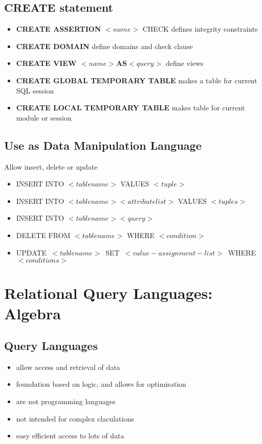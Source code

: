 \documentclass{article}
\begin{document}
	\subsection{CREATE statement}
		\begin{itemize}
			\item \textbf{CREATE ASSERTION} $<name>$ CHECK defines integrity constraints
			\item \textbf{CREATE DOMAIN} define domains and check clause
			\item \textbf{CREATE VIEW $<name> \textbf{AS} <query>$} define views
			\item \textbf{CREATE GLOBAL TEMPORARY TABLE} makes a table for current SQL session
			\item \textbf{CREATE LOCAL TEMPORARY TABLE} makes table for current module or session
		\end{itemize}

	\subsection{Use as Data Manipulation Language}
		Allow insert, delete or update

		\begin{itemize}
			\item INSERT INTO $<tablename>$ VALUES $<tuple>$
			\item INSERT INTO $<tablename> <attributelist>$ VALUES $<tuples>$
			\item INSERT INTO $<tablename> <query>$
			\item DELETE FROM $<tablename>$ WHERE $<condition>$
			\item \mbox{UPDATE $<tablename>$ SET $<value-assignment-list>$ WHERE $<conditions>$}
		\end{itemize}

\section{Relational Query Languages: Algebra}
	\subsection{Query Languages}
		\begin{itemize}
			\item allow access and retrieval of data
			\item foundation based on logic, and allows for optimisation
			\item are not programming languages
			\item not intended for complex claculations
			\item easy efficient access to lots of data
		\end{itemize}
\end{document}
